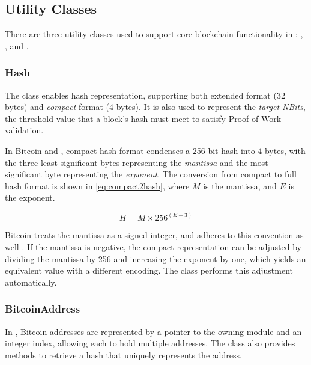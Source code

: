 \subsection{Utility Classes}\label{subsec:impl-utility}

There are three utility classes used to support core blockchain functionality
in \iblock{}: , , and .

\subsubsection{Hash}\label{subsubsec:impl-hash}

The  class enables hash representation, supporting both extended
format (32 bytes) and \emph{compact} format (4 bytes). It is also used to
represent the \emph{target NBits}, the threshold value that a block's hash must
meet to satisfy Proof-of-Work validation.

In Bitcoin and \iblock{}, compact hash format condenses a 256-bit hash into 4
bytes, with the three least significant bytes representing the \emph{mantissa}
and the most significant byte representing the \emph{exponent}. The conversion
from compact to full hash format is shown in \eqref{eq:compact2hash}, where
\(M\) is the mantissa, and \(E\) is the exponent.

\begin{equation}\label{eq:compact2hash}
	H = M \times 256^{(E - 3)}
\end{equation}

Bitcoin treats the mantissa as a signed integer, and \iblock{} adheres to this
convention as well \cite{bitcoin-dev}. If the mantissa is negative, the compact
representation can be adjusted by dividing the mantissa by 256 and increasing
the exponent by one, which yields an equivalent value with a different
encoding. The  class performs this adjustment automatically.

\subsubsection{BitcoinAddress}\label{subsubsec:impl-bitcoinaddress}

In \iblock{}, Bitcoin addresses are represented by a pointer to the owning
 module and an integer index, allowing each  to hold
multiple addresses. The  class also provides methods to
retrieve a hash that uniquely represents the address.

